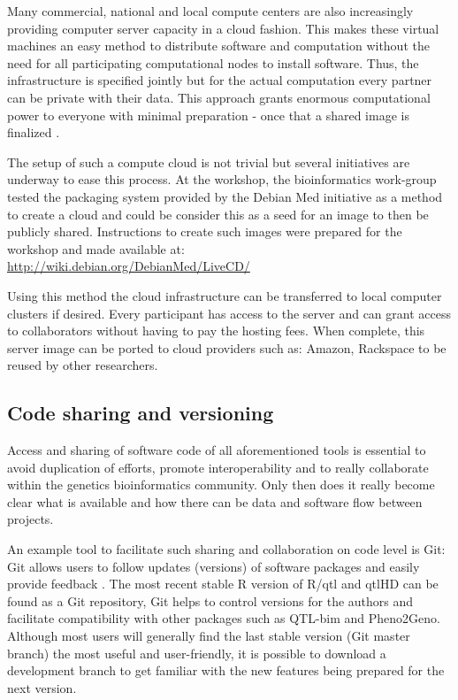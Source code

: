 Many commercial, national and local compute centers are also increasingly providing computer
server capacity in a cloud fashion. This makes these virtual machines an easy method to distribute 
software and computation without the need for all participating computational nodes to install 
software. Thus, the infrastructure is specified jointly \cite{Foster:2008} but for the actual computation every 
partner can be private with their data. This approach grants enormous computational power to 
everyone with minimal preparation - once that a shared image is finalized \cite{Krampis:2012}.

The setup of such a compute cloud is not trivial but several initiatives are underway to ease 
this process. At the workshop, the bioinformatics work-group tested the packaging system provided by 
the Debian Med initiative as a method to create a cloud and could be consider this as a seed 
for an image to then be publicly shared. Instructions to create such images were prepared for 
the workshop and made available at:\\
\url{http://wiki.debian.org/DebianMed/LiveCD/}
 
Using this method the cloud infrastructure can be transferred to local computer clusters 
if desired. Every participant has access to the server and can grant access to collaborators 
without having to pay the hosting fees. When complete, this server image can be ported to 
cloud providers such as: Amazon, Rackspace to be reused by other researchers.

\subsection{Code sharing and versioning}
\label{sect:CodeSharing}
Access and sharing of software code of all aforementioned tools is essential to avoid 
duplication of efforts, promote interoperability and to really collaborate within the 
genetics bioinformatics community. Only then does it really become clear what is available 
and how there can be data and software flow between projects.

An example tool to facilitate such sharing and collaboration on code level is Git: Git 
allows users to follow updates (versions) of software packages and easily provide feedback \cite{Git:2007}. 
The most recent stable R version of R/qtl and qtlHD can be found as a Git repository, Git 
helps to control versions for the authors and facilitate compatibility with other packages 
such as QTL-bim and Pheno2Geno. Although most users will generally find the last stable version 
(Git master branch) the most useful and user-friendly, it is possible to download a 
development branch to get familiar with the new features being prepared for the next version.

